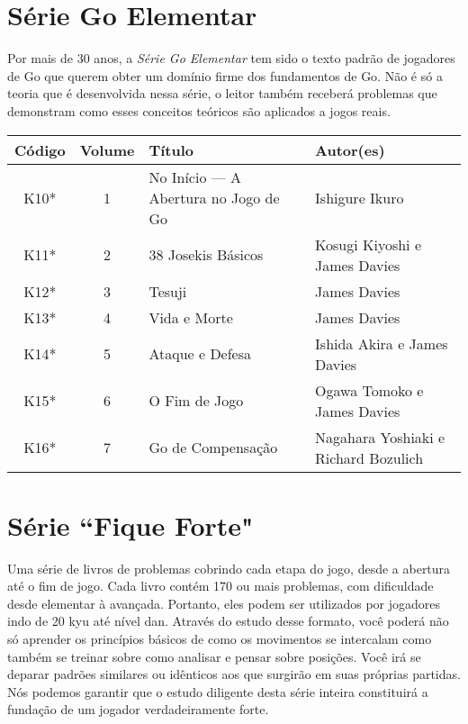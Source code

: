 \section{Série Go Elementar}

Por mais de 30 anos, a \emph{Série Go Elementar} tem sido o texto padrão de jogadores de Go que querem obter um domínio firme dos fundamentos de Go. Não é só a teoria que é desenvolvida nessa série, o leitor também receberá problemas que demonstram como esses conceitos teóricos são aplicados a jogos reais.

\begin{longtable}{c|c|p{45mm}|p{45mm}} 
    \hline
    \textbf{Código} & \textbf{Volume} & \textbf{Título} &\textbf{Autor(es)} \\
    \hline \hline
    K10* & 1 & No Início --- A Abertura no Jogo de Go & Ishigure Ikuro \\
    \hline
    K11* & 2 & 38 Josekis Básicos & Kosugi Kiyoshi e James Davies \\
    \hline
    K12* & 3 & Tesuji & James Davies \\
    \hline
    K13* & 4 & Vida e Morte & James Davies \\
    \hline
    K14* & 5 & Ataque e Defesa & Ishida Akira e James Davies \\
    \hline
    K15* & 6 & O Fim de Jogo & Ogawa Tomoko e James Davies \\
    \hline
    K16* & 7 & Go de Compensação & Nagahara Yoshiaki e Richard Bozulich \\
    \hline
\end{longtable}

\section{Série ``Fique Forte"}

Uma série de livros de problemas cobrindo cada etapa do jogo, desde a abertura até o fim de jogo. Cada livro contém 170 ou mais problemas, com dificuldade desde elementar à avançada. Portanto, eles podem ser utilizados por jogadores indo de 20 kyu até nível dan. Através do estudo desse formato, você poderá não só aprender os princípios básicos de como os movimentos se intercalam como também se treinar sobre como analisar e pensar sobre posições. Você irá se deparar padrões similares ou idênticos aos que surgirão em suas próprias partidas. Nós podemos garantir que o estudo diligente desta série inteira constituirá a fundação de um jogador verdadeiramente forte.

